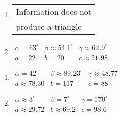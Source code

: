 \begin{multicols}{2} 

\begin{enumerate}

\setcounter{enumi}{\value{HW}}

\item \begin{tabular}{l}
Information does not \\
produce a triangle \end{tabular}

\item $\begin{array}{lll}
\alpha = 63^{\circ} & \beta \approx 54.1^{\circ} & \gamma \approx 62.9^{\circ} \\
a = 22 & b = 20 & c \approx 21.98 \end{array}$

\setcounter{HW}{\value{enumi}}

\end{enumerate}

\end{multicols}

\begin{multicols}{2} 

\begin{enumerate}

\setcounter{enumi}{\value{HW}}

\item $\begin{array}{lll}
\alpha = 42^{\circ} & \beta \approx 89.23^{\circ} & \gamma \approx 48.77^{\circ} \\
a \approx 78.30 & b = 117 & c = 88 \end{array}$

\item $\begin{array}{lll}
\alpha \approx 3^{\circ} & \beta = 7^{\circ} & \gamma = 170^{\circ} \\
a \approx 29.72 & b \approx 69.2 & c = 98.6 \end{array}$

\setcounter{HW}{\value{enumi}}

\end{enumerate}

\end{multicols}

